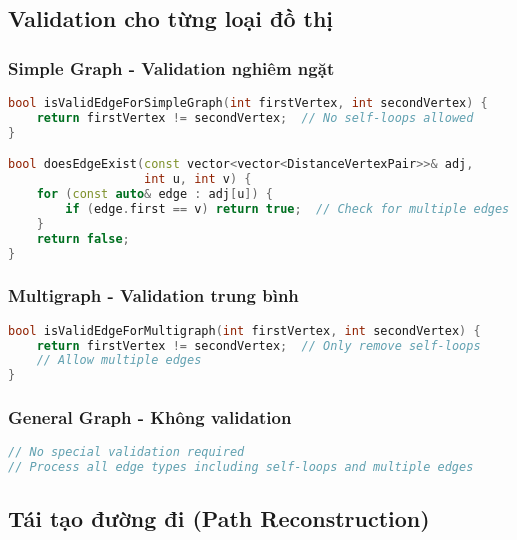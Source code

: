 \documentclass[12pt]{article}
\begin{document}
\subsection*{Validation cho từng loại đồ thị}

\subsubsection*{Simple Graph - Validation nghiêm ngặt}
\begin{lstlisting}[language=C++, basicstyle=\ttfamily\footnotesize, frame=single]
bool isValidEdgeForSimpleGraph(int firstVertex, int secondVertex) {
    return firstVertex != secondVertex;  // No self-loops allowed
}

bool doesEdgeExist(const vector<vector<DistanceVertexPair>>& adj, 
                   int u, int v) {
    for (const auto& edge : adj[u]) {
        if (edge.first == v) return true;  // Check for multiple edges
    }
    return false;
}
\end{lstlisting}

\subsubsection*{Multigraph - Validation trung bình}
\begin{lstlisting}[language=C++, basicstyle=\ttfamily\footnotesize, frame=single]
bool isValidEdgeForMultigraph(int firstVertex, int secondVertex) {
    return firstVertex != secondVertex;  // Only remove self-loops
    // Allow multiple edges
}
\end{lstlisting}

\subsubsection*{General Graph - Không validation}
\begin{lstlisting}[language=C++, basicstyle=\ttfamily\footnotesize, frame=single]
// No special validation required
// Process all edge types including self-loops and multiple edges
\end{lstlisting}

\subsection*{Tái tạo đường đi (Path Reconstruction)}
\end{document}
